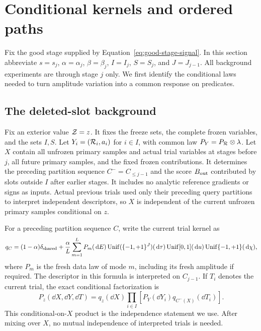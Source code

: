 \section{Conditional kernels and ordered paths}\label{sec:paths}

Fix the good stage supplied by Equation~\ref{eq:good-stage-signal}.
In this section abbreviate $s=s_j$, $\alpha=\alpha_j$, $\beta=\beta_j$,
$I=I_j$, $S=S_j$, and $J=J_{j-1}$. All background experiments are
through stage $j$ only. We first identify the conditional laws needed
to turn amplitude variation into a common response on predicates.

\subsection{The deleted-slot background}

Fix an exterior value $\mathcal Z=z$. It fixes the freeze sets, the complete
frozen variables, and the sets $I,S$. Let $Y_i=(\mathcal R_i,a_i)$ for $i\in I$,
with common law $P_Y=P_{\mathcal R}\otimes\lambda$. Let $X$ contain all
unfrozen primary samples and actual trial variables at stages before
$j$, all future primary samples, and the fixed frozen contributions.
It determines the preceding partition sequence
$C^-=C_{\le j-1}$ and the score $B_{\rm out}$ contributed by slots
outside $I$ after earlier stages. It includes no analytic reference
gradients or signs as inputs. Actual previous trials used only their
preceding query partitions to interpret independent descriptors, so
$X$ is independent of the current unfrozen primary samples conditional
on $z$.

For a preceding partition sequence $C$, write the current trial kernel as
\begin{equation}\label{eq:trial-kernel}
 q_C=(1-\alpha)\delta_{\rm shared}
 +\frac\alpha L\sum_{m=1}^L
       P_m(\,\mathrm d E)\operatorname{Unif}(\{-1,+1\}^{J})(\,\mathrm d\tau)
          \operatorname{Unif}[0,1](\,\mathrm d u)
          \operatorname{Unif}\{-1,+1\}(\,\mathrm d\chi),
\end{equation}
where $P_m$ is the fresh data law of mode $m$, including its fresh
amplitude if required. The descriptor in this formula is interpreted
on $C_{j-1}$. If $T_i$ denotes the current trial, the exact conditional
factorization is
\begin{equation}\label{eq:conditional-product}
 P_z(\dd X,\dd Y,\dd T)
 =q_z(\dd X)\prod_{i\in I}
                  [P_Y(\dd Y_i)q_{C^-(X)}(\dd T_i)].
\end{equation}
This conditional-on-$X$ product is the independence statement we use.
After mixing over $X$, no mutual independence of interpreted trials
is needed.

